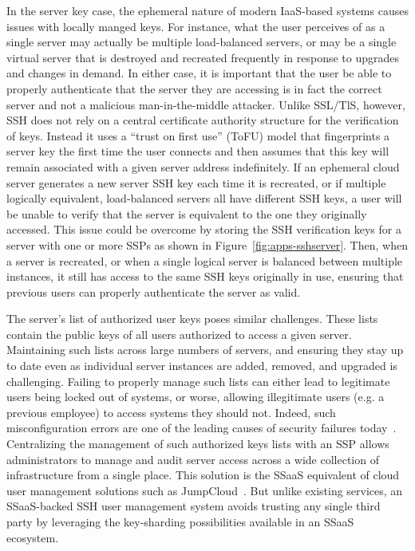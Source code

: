 In the server key case, the ephemeral nature of modern IaaS-based
systems causes issues with locally manged keys. For instance, what the
user perceives of as a single server may actually be multiple
load-balanced servers, or may be a single virtual server that is
destroyed and recreated frequently in response to upgrades and changes
in demand. In either case, it is important that the user be able to
properly authenticate that the server they are accessing is in fact
the correct server and not a malicious man-in-the-middle
attacker. Unlike SSL/TlS, however, SSH does not rely on a central
certificate authority structure for the verification of keys. Instead
it uses a ``trust on first use'' (ToFU) model that fingerprints a
server key the first time the user connects and then assumes that this
key will remain associated with a given server address
indefinitely. If an ephemeral cloud server generates a new server SSH
key each time it is recreated, or if multiple logically equivalent,
load-balanced servers all have different SSH keys, a user will be
unable to verify that the server is equivalent to the one they
originally accessed. This issue could be overcome by storing the SSH
verification keys for a server with one or more SSPs as shown in
Figure~\ref{fig:apps-sshserver}. Then, when a server is recreated, or
when a single logical server is balanced between multiple instances,
it still has access to the same SSH keys originally in use, ensuring
that previous users can properly authenticate the server as valid.

The server's list of authorized user keys poses similar
challenges. These lists contain the public keys of all users
authorized to access a given server. Maintaining such lists across
large numbers of servers, and ensuring they stay up to date even as
individual server instances are added, removed, and upgraded is
challenging. Failing to properly manage such lists can either lead to
legitimate users being locked out of systems, or worse, allowing
illegitimate users (e.g. a previous employee) to access systems they
should not. Indeed, such misconfiguration errors are one of the
leading causes of security failures today~\cite{bishop1996,
  kerravala2002}. Centralizing the management of such authorized keys
lists with an SSP allows administrators to manage and audit server
access across a wide collection of infrastructure from a single
place. This solution is the SSaaS equivalent of cloud user management
solutions such as JumpCloud~\cite{jumpcloud}. But unlike existing
services, an SSaaS-backed SSH user management system avoids trusting
any single third party by leveraging the key-sharding possibilities
available in an SSaaS ecosystem.

